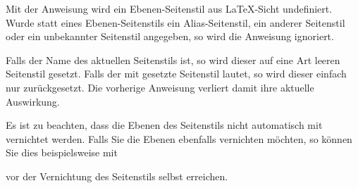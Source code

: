 \begin{Declaration}
\end{Declaration}
%
%
\iftrue%
Mit der Anweisung wird ein Ebenen-Seitenstil aus \LaTeX-Sicht undefiniert.
Wurde statt eines Ebenen-Seitenstils ein Alias-Seitenstil, ein anderer
Seitenstil oder ein unbekannter Seitenstil angegeben, so wird die Anweisung
ignoriert.%
\else%
Mit dieser Anweisung kann ein Ebenen-Seitenstil aus \LaTeX-Sicht wieder
undefiniert werden. Dies gilt jedoch nur, wenn es einen Ebenen-Seitenstil mit
dem Namen \PName{Ebenen-Seitenstil-Name} auch tatsächlich gibt. Handelt es sich
stattdessen um einen Alias-Seitenstil -- auch wenn dieser zu einem
Ebenen-Seitenstil führt -- oder um einen anderen Seitenstil oder ist gar kein
Seitenstil mit dem Namen \PName{Ebenen-Seitenstil-Name} bekannt, so geschieht
nichts, die Anweisung wird ignoriert.%
\fi

Falls  der Name des aktuellen Seitenstils ist,
so wird dieser auf eine Art leeren Seitenstil gesetzt. Falls der mit
 gesetzte Seitenstil
 lautet, so wird dieser einfach nur
zurückgesetzt. Die vorherige Anweisung 
verliert damit ihre aktuelle Auswirkung.

Es ist zu beachten, dass die Ebenen des Seitenstils nicht
automatisch mit vernichtet werden. Falls Sie die Ebenen ebenfalls vernichten
möchten, so können Sie dies beispielsweise mit
\begin{lstcode}
\end{lstcode}
vor der Vernichtung des Seitenstils selbst erreichen.%
\iffalse %
\par
Die Anweisung ist dazu bestimmt, innerhalb des Arguments \PName{Code} von
\DescRef{\LabelBase.cmd.scrlayerOnAutoRemoveInterface} (siehe
\autoref{sec:scrlayer.enduserinterfaces},
\DescPageRef{scrlayer.cmd.scrlayerOnAutoRemoveInterface}) verwendet zu
werden, um Seitenstile, die als Teil eines Endanwender-Interfaces definiert
wurden, beim automatischen Entfernen dieses Interfaces mit zu entfernen.%
\fi %
\EndIndexGroup
\EndIndexGroup


